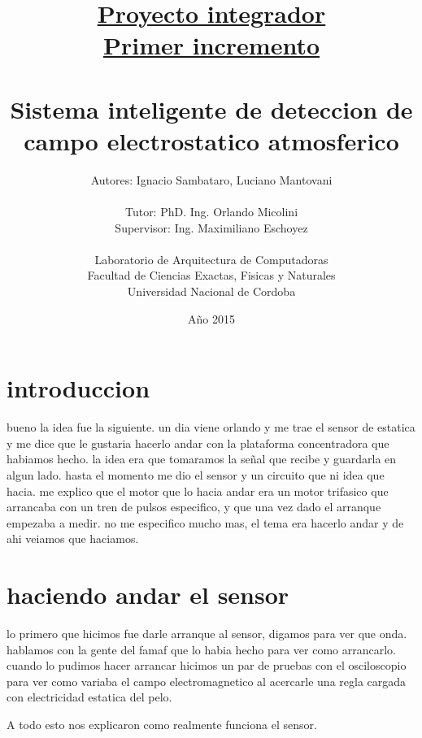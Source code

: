 \documentclass[a4paper]{article}
\title{\underline{Proyecto integrador} \\
\large \underline{Primer incremento} \\
\huge \textbf{ \\ Sistema inteligente de deteccion de campo electrostatico atmosferico} \\ }
\author{Autores: Ignacio Sambataro, Luciano Mantovani\\ \\
  \large Tutor: PhD. Ing. Orlando Micolini \\
  \large Supervisor: Ing. Maximiliano Eschoyez \\ \\
  \small Laboratorio de Arquitectura de Computadoras\\
  \small Facultad de Ciencias Exactas, Fisicas y Naturales\\
  \small Universidad Nacional de Cordoba\\
  \date{Año 2015}
}
\begin{document}
\maketitle
\thispagestyle{empty}

\clearpage

\tableofcontents
\thispagestyle{empty}

\clearpage
\setcounter{page}{1}


\section{introduccion} %
\label{sec:introduccion}
bueno la idea fue la siguiente. un dia viene orlando y me trae el sensor de estatica y me dice que le gustaria hacerlo andar con la plataforma concentradora que habiamos hecho. la idea era que tomaramos la señal que recibe y guardarla en algun lado. hasta el momento me dio el sensor y un circuito que ni idea que hacia. me explico que el motor que lo hacia andar era un motor trifasico que arrancaba con un tren de pulsos especifico, y que una vez dado el arranque empezaba a medir. no me especifico mucho mas, el tema era hacerlo andar y de ahi veiamos que haciamos.




\section{haciendo andar el sensor} %
\label{sec:haciendo_andar_el_sensor}
lo primero que hicimos fue darle arranque al sensor, digamos para ver que onda. hablamos con la gente del famaf que lo habia hecho para ver como arrancarlo. cuando lo pudimos hacer arrancar hicimos un par de pruebas con el osciloscopio para ver como variaba el campo electromagnetico al acercarle una regla cargada con electricidad estatica del pelo.

A todo esto nos explicaron como realmente funciona el sensor.

\end{document}
